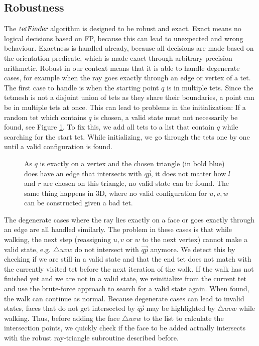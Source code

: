 \documentclass[../thesis.tex]{subfiles}
\begin{document}
\subsection{Robustness}\label{subsec:degenerate}
The $\textsl{tetFinder}$ algorithm is designed to be robust and exact.
Exact means no logical decisions
based on FP, because this can lead to unexpected and wrong behaviour.
Exactness is handled already, because all decisions are made based on the orientation predicate,
which is made exact through arbitrary precision arithmetic.
Robust in our context means that it is able to handle degenerate cases, for example when
the ray goes exactly through an edge or vertex of a tet.
The first case to handle is when the starting point $q$ is in multiple tets.
Since the tetmesh is not a disjoint union of tets as they share their boundaries,
a point can be in multiple tets at once. This can lead to problems in the initialization:
If a random tet which contains $q$ is chosen, a valid state must not necessarily be found, see Figure \ref{fig:validstatefail}.
To fix this, we add all tets to a list that contain $q$ while searching for the start tet.
While initializing, we go through the tets one by one until a valid configuration is found.
\begin{figure}[htb]
  \centering
  \def\svgwidth{15em}
  
  \caption{As $q$ is exactly on a vertex and the chosen triangle (in bold blue) does
  have an edge that intersects with $\Vec{qp}$,
  it does not matter how $l$ and $r$ are chosen on this triangle, no valid state can be found.
  The same thing happens in 3D, where no valid configuration for $u,v,w$ can be constructed given a bad tet.
  }\label{fig:validstatefail}
\end{figure}
The degenerate cases where the ray lies exactly on a face or goes exactly through an edge are all handled similarly.
The problem in these cases is that while walking, the next step (reassigning $u,v$ or $w$ to the next vertex) cannot
make a valid state, e.g. $\triangle uvw$ do not intersect with $\Vec{qp}$ anymore.
We detect this by checking if we are still in a valid state and that the end tet does not
match with the currently visited tet before the next iteration of the walk.
If the walk has not finished yet and we are not in a valid state, we reinitialize from the current tet and use the brute-force approach to search
for a valid state again. When found, the walk can continue as normal.
Because degenerate cases can lead to invalid states, faces that do not get intersected
by $\Vec{qp}$ may be highlighted by $\triangle uvw$ while walking.
Thus, before adding the face $\triangle uvw$ to the list to calculate the intersection points,
we quickly check if the face to be added actually intersects with the robust ray-triangle subroutine described before.
\end{document}

